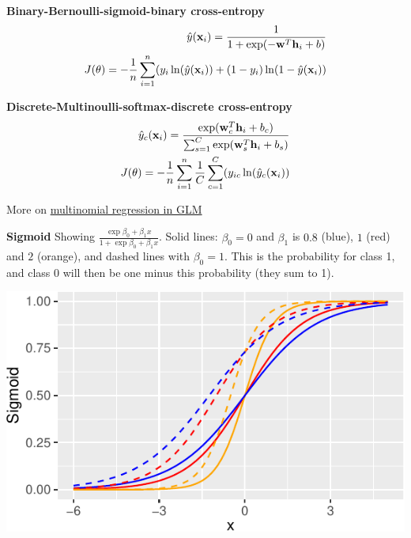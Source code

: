 \documentclass[
  ignorenonframetext,
]{beamer}
\begin{document}
\begin{frame}
\textbf{Binary-Bernoulli-sigmoid-binary cross-entropy} \begin{eqnarray*}
\hat{y}({\bf x}_i)=\frac{1}{1+\exp(-{\bf w}^T {\bf h}_i+b)}\\
J({\theta})=-\frac{1}{n}\sum_{i=1}^n (y_i\ln({\hat{y}({\bf x}_i)})+(1-y_i)\ln(1-{\hat{y}({\bf x}_i)})
\end{eqnarray*}

\textbf{Discrete-Multinoulli-softmax-discrete cross-entropy}
\begin{eqnarray*}
\hat{y}_c({\bf x}_i)=\frac{\exp({\bf w}_c^T {\bf h}_i+b_c)}{\sum_{s=1}^{C}\exp({\bf w}_s^T {\bf h}_i+b_s)}\\
J(\theta)=-\frac{1}{n}\sum_{i=1}^n\frac{1}{C} \sum_{c=1}^C (y_{ic}\ln({\hat{y}_c({\bf x}_i)})
\end{eqnarray*}

More on
\href{https://www.math.ntnu.no/emner/TMA4315/2018h/6Categorical.html}{multinomial
regression in GLM}
\end{frame}

\begin{frame}
\textbf{Sigmoid} Showing
\(\frac{\exp{\beta_0+\beta_1x}}{1+\exp{\beta_0+\beta_1x}}\). Solid
lines: \(\beta_0=0\) and \(\beta_1\) is \(0.8\) (blue), \(1\) (red) and
\(2\) (orange), and dashed lines with \(\beta_0=1\). This is the
probability for class 1, and class 0 will then be one minus this
probability (they sum to 1).

\includegraphics{L9_files/figure-beamer/unnamed-chunk-1-1.pdf}
\end{frame}
\end{document}
